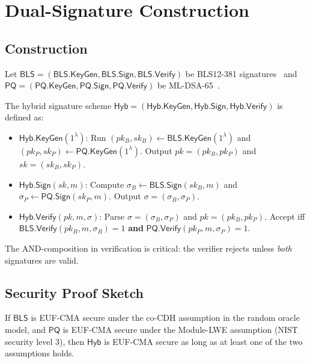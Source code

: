 \section{Dual-Signature Construction}

\label{sec:dual-sig}

\subsection{Construction}

Let $\textsf{BLS} = (\textsf{BLS.KeyGen}, \textsf{BLS.Sign}, \textsf{BLS.Verify})$ be
BLS12-381 signatures~\cite{boneh2001bls} and $\textsf{PQ} = (\textsf{PQ.KeyGen},
\textsf{PQ.Sign}, \textsf{PQ.Verify})$ be ML-DSA-65~\cite{fips204}.

\begin{definition}
\label{def:hybrid-sig}
The hybrid signature scheme $\textsf{Hyb} = (\textsf{Hyb.KeyGen}, \textsf{Hyb.Sign},
\textsf{Hyb.Verify})$ is defined as:
\begin{itemize}[leftmargin=2em]
  \item $\textsf{Hyb.KeyGen}(1^\lambda)$: Run $(pk_B, sk_B) \leftarrow \textsf{BLS.KeyGen}(1^\lambda)$
        and $(pk_P, sk_P) \leftarrow \textsf{PQ.KeyGen}(1^\lambda)$.
        Output $pk = (pk_B, pk_P)$ and $sk = (sk_B, sk_P)$.
  \item $\textsf{Hyb.Sign}(sk, m)$: Compute $\sigma_B \leftarrow \textsf{BLS.Sign}(sk_B, m)$
        and $\sigma_P \leftarrow \textsf{PQ.Sign}(sk_P, m)$.
        Output $\sigma = (\sigma_B, \sigma_P)$.
  \item $\textsf{Hyb.Verify}(pk, m, \sigma)$: Parse $\sigma = (\sigma_B, \sigma_P)$
        and $pk = (pk_B, pk_P)$. Accept iff
        $\textsf{BLS.Verify}(pk_B, m, \sigma_B) = 1$ \textbf{and}
        $\textsf{PQ.Verify}(pk_P, m, \sigma_P) = 1$.
\end{itemize}
\end{definition}

The AND-composition in verification is critical: the verifier rejects unless
\emph{both} signatures are valid.

\subsection{Security Proof Sketch}

\begin{theorem}
\label{thm:hybrid-euf}
If $\textsf{BLS}$ is EUF-CMA secure under the co-CDH assumption in the random oracle
model, and $\textsf{PQ}$ is EUF-CMA secure under the Module-LWE assumption (NIST
security level 3), then $\textsf{Hyb}$ is EUF-CMA secure as long as at least one
of the two assumptions holds.
\end{theorem}

